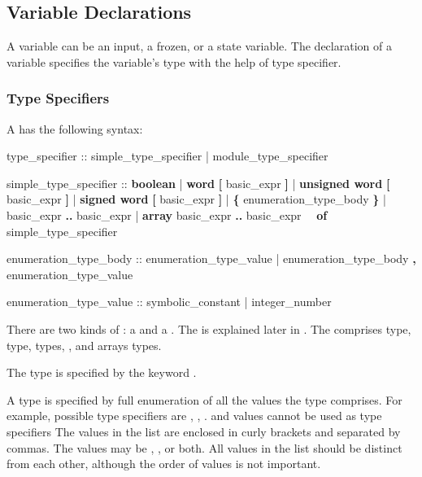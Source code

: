 \subsection{Variable Declarations}
\label{Variable Declarations}

A variable can be an input, a frozen, or a state variable.
%
The declaration of a variable specifies the variable's type with the
help of type specifier.

\subsubsection{Type Specifiers}
\label{Type Specifiers}
%
A  has the following syntax:
%
\begin{Grammar}
type_specifier ::
        simple_type_specifier
      | module_type_specifier

simple_type_specifier ::
        \textbf{boolean}
      | \textbf{word} \textbf{[} basic_expr \textbf{]}
      | \textbf{unsigned word} \textbf{[} basic_expr \textbf{]}
      | \textbf{signed word} \textbf{[} basic_expr \textbf{]}
      | \textbf{\{} enumeration_type_body \textbf{\}}
      | basic_expr \textbf{..} basic_expr
      | \textbf{array} basic_expr \textbf{..} basic_expr
        \ \ \textbf{of} simple_type_specifier

enumeration_type_body ::
        enumeration_type_value
      | enumeration_type_body \textbf{,} enumeration_type_value

enumeration_type_value ::
        symbolic_constant
      | integer_number
\end{Grammar}
%
There are two kinds of : a  and a .
%
The  is explained later in
.
%
The  comprises \Boolean type, \Integer
type, \Enum types, \UWord, \SWord and arrays
types.

The \Boolean type is specified by the keyword .

A \Enum type is specified by full enumeration of all the values the
type comprises.
%
For example, possible \Enum type specifiers are ,
, .  and
 values cannot be used as \Enum type specifiers
%
The values in the list are enclosed in curly brackets and separated by
commas.
%
The values may be , , or both.
%
All values in the list should be distinct from each other, although the
order of values is not important.

